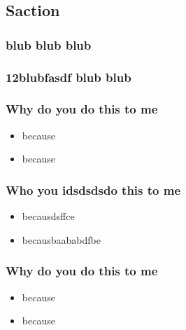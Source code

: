 \documentclass{beamer}
\begin{document}
        \subsection{Saction}
            \begin{frame}
                \frametitle{blub blub blub}
            \end{frame}
            \begin{frame}
                \frametitle{12blubfasdf blub blub}
            \end{frame}
        \begin{frame}
            \frametitle{Why do you do this to me}
            \begin{itemize}
                \item because
                \item because
            \end{itemize}
        \end{frame}
        \begin{frame}
            \frametitle{Who you idsdsdsdo this to me}
            \begin{itemize}
                \item becausdsffce
                \item becausbaababdfbe
            \end{itemize}
        \end{frame}
        \begin{frame}
            \frametitle{Why do you do this to me}
            \begin{itemize}
                \item because
                \item because
            \end{itemize}
        \end{frame}
\end{document}
